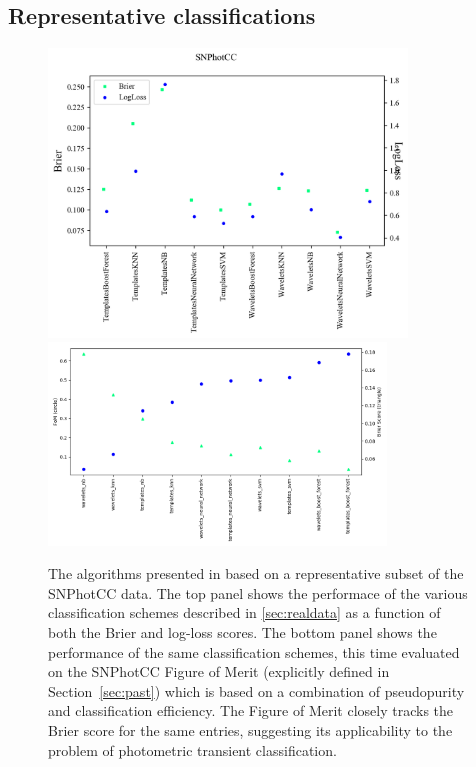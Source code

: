 \subsection{Representative classifications}
\label{sec:realresults}

\begin{figure}
	\begin{center}
		\includegraphics[width=0.85\textwidth]{./fig/SNPhotCC_res.png}\\
		 \includegraphics[width=0.8\textwidth]{./fig/fom_vs_brier.png}
		\caption{The algorithms presented in \cite{lochner_photometric_2016} based on a representative subset of the SNPhotCC data.
		The top panel shows the performace of the various classification schemes described in \ref{sec:realdata} as a function of both the Brier and log-loss scores.
		The bottom panel shows the performance of the same classification schemes, this time evaluated on the SNPhotCC Figure of Merit (explicitly defined in Section~\ref{sec:past}) which is based on a combination of pseudopurity and classification efficiency.
		The Figure of Merit closely tracks the Brier score for the same entries, suggesting its applicability to the problem of photometric transient classification.
		\label{fig:real_metric_compare}}
	\end{center}
\end{figure}

